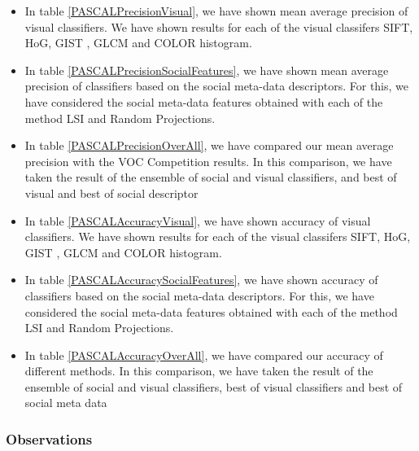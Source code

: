\begin{itemize}
\item In table \ref{PASCALPrecisionVisual}, we have shown mean average precision of visual classifiers. We have shown results for each of the visual classifers SIFT, HoG, GIST , GLCM and COLOR histogram.
\item In table \ref{PASCALPrecisionSocialFeatures}, we have shown mean average precision of classifiers based on the social meta-data descriptors. For this, we have considered the social meta-data features obtained with each of the method LSI and Random Projections.
\item In table \ref{PASCALPrecisionOverAll}, we have compared our mean average precision with the  VOC Competition results. In this comparison, we have taken the result of the ensemble of social and visual classifiers, and best of visual and best of social descriptor 
\item In table \ref{PASCALAccuracyVisual},  we have shown accuracy of visual classifiers. We have shown results for each of the visual classifers SIFT, HoG, GIST , GLCM and COLOR histogram.
\item In table \ref{PASCALAccuracySocialFeatures}, we have shown accuracy  of classifiers based on the social meta-data descriptors. For this, we have considered the social meta-data features obtained with each of the method LSI and Random Projections.
\item In table \ref{PASCALAccuracyOverAll}, we have compared our accuracy of different methods. In this comparison, we have taken the result of the ensemble of social and visual classifiers,  best of visual classifiers and best of social meta data 
\end{itemize}

\subsubsection*{Observations}

